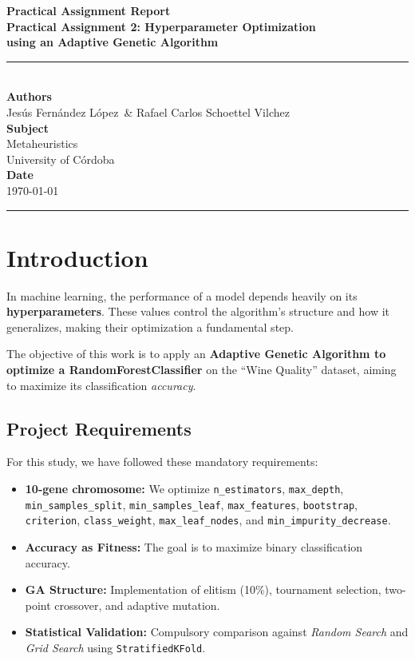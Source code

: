 \documentclass[12pt, a4paper]{article}
\newcommand{\reporttitle}{Practical Assignment 2: Hyperparameter Optimization\\[0.3cm]
\large using an Adaptive Genetic Algorithm}
\newcommand{\reportdate}{\today}
\newcommand{\authorA}{Jesús Fernández López}
\newcommand{\authorB}{Rafael Carlos Schoettel Vilchez}
\begin{document}
\begin{titlepage}
  \centering
  \vspace*{3cm}
  {\Huge \textbf{Practical Assignment Report}}\\[0.8cm]
  {\LARGE \textbf{\reporttitle}}\\[0.5cm]
  \rule{\textwidth}{0.4pt}\\[2cm]
  {\Large \textbf{Authors}}\\[0.4cm]
  {\large \authorA\ \& \authorB}\\[1.5cm]
  {\Large \textbf{Subject}}\\[0.4cm]
  {\large Metaheuristics}\\[0.4cm]
  {\normalsize University of Córdoba}\\[1.5cm]
  {\Large \textbf{Date}}\\[0.4cm]
  {\large \reportdate}
  \vfill
  \rule{\textwidth}{0.4pt}
\end{titlepage}

\newpage
\tableofcontents
\newpage

\section{Introduction}

In machine learning, the performance of a model depends heavily on its
\textbf{hyperparameters}. These values control the algorithm's structure and how it
generalizes, making their optimization a fundamental step.

The objective of this work is to apply an \textbf{Adaptive Genetic Algorithm to
optimize a RandomForestClassifier} on the ``Wine Quality'' dataset, aiming to
maximize its classification \textit{accuracy}.

\subsection{Project Requirements}

For this study, we have followed these mandatory requirements:

\begin{itemize}[itemsep=0.2em]
  \item \textbf{10-gene chromosome:} We optimize \texttt{n\_estimators}, \texttt{max\_depth},
        \texttt{min\_samples\_split}, \texttt{min\_samples\_leaf}, \texttt{max\_features},
        \texttt{bootstrap}, \texttt{criterion}, \texttt{class\_weight}, \texttt{max\_leaf\_nodes},
        and \texttt{min\_impurity\_decrease}.
  \item \textbf{Accuracy as Fitness:} The goal is to maximize binary classification accuracy.
  \item \textbf{GA Structure:} Implementation of elitism (10\%), tournament selection,
        two-point crossover, and adaptive mutation.
  \item \textbf{Statistical Validation:} Compulsory comparison against \textit{Random Search}
        and \textit{Grid Search} using \texttt{StratifiedKFold}.
\end{itemize}
\end{document}
